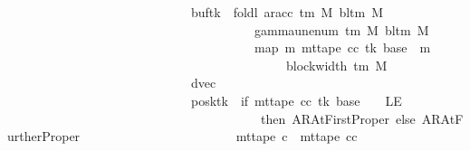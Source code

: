 \begin{isabellebody}
\ \ \ \ \ \ \ \ \ \ \ \ \ \ \ \ \ \ \ \ \ \ \ \ \ \ \ \ \ buf{\isacharparenleft}{\kern0pt}tk\ {\isacharcolon}{\kern0pt}{\isacharequal}{\kern0pt}\ foldl\ {\isacharparenleft}{\kern0pt}ar{\isacharunderscore}{\kern0pt}acc\ {\isacharparenleft}{\kern0pt}{\isasymGamma}{\isacharunderscore}{\kern0pt}tm\ M{\isacharparenright}{\kern0pt}\ {\isacharparenleft}{\kern0pt}bl{\isacharunderscore}{\kern0pt}tm\ M{\isacharparenright}{\kern0pt}{\isacharparenright}{\kern0pt}\isanewline
\ \ \ \ \ \ \ \ \ \ \ \ \ \ \ \ \ \ \ \ \ \ \ \ \ \ \ \ \ \ \ \ \ \ \ \ \ \ \ {\isacharparenleft}{\kern0pt}gamma{\isacharunderscore}{\kern0pt}unenum\ {\isacharparenleft}{\kern0pt}{\isasymGamma}{\isacharunderscore}{\kern0pt}tm\ M{\isacharparenright}{\kern0pt}\ {\isacharparenleft}{\kern0pt}bl{\isacharunderscore}{\kern0pt}tm\ M{\isacharparenright}{\kern0pt}\ {}{\isacharparenright}{\kern0pt}\isanewline
\ \ \ \ \ \ \ \ \ \ \ \ \ \ \ \ \ \ \ \ \ \ \ \ \ \ \ \ \ \ \ \ \ \ \ \ \ \ \ {\isacharparenleft}{\kern0pt}map\ {\isacharparenleft}{\kern0pt}{\isasymlambda}m{\isachardot}{\kern0pt}\ mt{\isacharunderscore}{\kern0pt}tape\ cc\ tk\ {\isacharparenleft}{\kern0pt}base\ {\isacharplus}{\kern0pt}\ m{\isacharparenright}{\kern0pt}{\isacharparenright}{\kern0pt}\isanewline
\ \ \ \ \ \ \ \ \ \ \ \ \ \ \ \ \ \ \ \ \ \ \ \ \ \ \ \ \ \ \ \ \ \ \ \ \ \ \ \ \ \ \ \ {\isacharbrackleft}{\kern0pt}{}{\isachardot}{\kern0pt}{\isachardot}{\kern0pt}{\isacharless}{\kern0pt}block{\isacharunderscore}{\kern0pt}width\ {\isacharparenleft}{\kern0pt}{\isasymGamma}{\isacharunderscore}{\kern0pt}tm\ M{\isacharparenright}{\kern0pt}\ {\isacharminus}{\kern0pt}\ {}{\isacharbrackright}{\kern0pt}{\isacharparenright}{\kern0pt}{\isacharparenright}{\kern0pt}{\isacharcomma}{\kern0pt}\isanewline
\ \ \ \ \ \ \ \ \ \ \ \ \ \ \ \ \ \ \ \ \ \ \ \ \ \ \ \ \ dvec{\isacharcomma}{\kern0pt}\isanewline
\ \ \ \ \ \ \ \ \ \ \ \ \ \ \ \ \ \ \ \ \ \ \ \ \ \ \ \ \ posk{\isacharparenleft}{\kern0pt}tk\ {\isacharcolon}{\kern0pt}{\isacharequal}{\kern0pt}\ if\ mt{\isacharunderscore}{\kern0pt}tape\ cc\ tk\ {\isacharparenleft}{\kern0pt}base\ {\isacharminus}{\kern0pt}\ {}{\isacharparenright}{\kern0pt}\ {\isacharequal}{\kern0pt}\ LE{}\isanewline
\ \ \ \ \ \ \ \ \ \ \ \ \ \ \ \ \ \ \ \ \ \ \ \ \ \ \ \ \ \ \ \ \ \ \ \ \ \ \ \ then\ AR{\isacharunderscore}{\kern0pt}AtFirstProper\ else\ AR{\isacharunderscore}{\kern0pt}AtFurtherProper{\isacharparenright}{\kern0pt}{\isacharparenright}{\kern0pt}\isanewline
\ \ \ \ \ \ \ \ \ \ \ \ \ \ \ \ \ \ \ \ \ \ \ {\isasymand}\ mt{\isacharunderscore}{\kern0pt}tape\ c{\isacharprime}{\kern0pt}{\isacharprime}{\kern0pt}\ {\isacharequal}{\kern0pt}\ mt{\isacharunderscore}{\kern0pt}tape\ cc\isanewline

\end{isabellebody}
